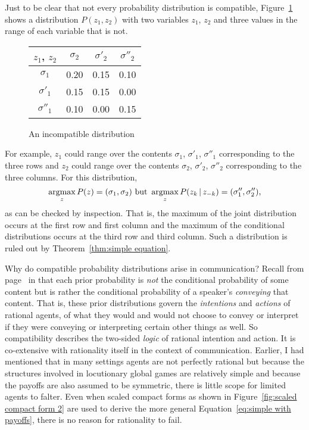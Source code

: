 Just to be clear that not every probability distribution is compatible, Figure~\ref{fig:incompatible distribution} shows a distribution $P(z_1, z_2)$ with two variables $z_1$, $z_2$ and three values in the range of each variable that is not.

\begin{figure}[h]
\renewcommand{\arraystretch}{1.8}
\begin{tabular}{|c|c|c|c|}					 \hline
$z_1$, $z_2$	& 		$\sigma_2$ & $\sigma'_2$ & $\sigma''_2$					\\\hline
$\sigma_1$					& 0.20 & 0.15 & 0.10		\\	\hline
$\sigma'_1$					& 0.15 & 0.15 & 0.00		\\	\hline
$\sigma''_1$				& 0.10 & 0.00 & 0.15		\\  \hline
\end{tabular}
\caption{An incompatible distribution} \label{fig:incompatible distribution}
\end{figure}


For example, $z_1$ could range over the contents $\sigma_1$, $\sigma'_1$, $\sigma''_1$ corresponding to the three rows and $z_2$ could range over the contents $\sigma_2$, $\sigma'_2$, $\sigma''_2$ corresponding to the three columns. For this distribution, \[\operatorname*{argmax}_{z} P(z) = (\sigma_1, \sigma_2)\text{ but }\operatorname*{argmax}_{z} P(z_k \,|\, z_{-k}) = (\sigma''_1, \sigma''_2)\text{,}\] as can be checked by inspection. That is, the maximum of the joint distribution occurs at the first row and first column and the maximum of the conditional distributions occurs at the third row and third column. Such a distribution is ruled out by Theorem~\ref{thm:simple equation}.

Why do compatible probability distributions arise in communication? Recall from page~\pageref{page:intention} in  that each prior probability is \emph{not} the conditional probability of some content but is rather the conditional probability of a speaker's \emph{conveying} that content. That is, these prior distributions govern the \emph{intentions} and \emph{actions} of rational agents, of what they would and would not choose to convey or interpret if they were conveying or interpreting certain other things as well. So compatibility describes the two-sided \emph{logic} of rational intention and action. It is co-extensive with rationality itself in the context of communication. Earlier, I had mentioned that in many settings agents are not perfectly rational but because the structures involved in locutionary global games are relatively simple and because the payoffs are also assumed to be symmetric, there is little scope for limited agents to falter. Even when scaled compact forms as shown in Figure~\ref{fig:scaled compact form 2} are used to derive the more general Equation~\ref{eq:simple with payoffs}, there is no reason for rationality to fail.

